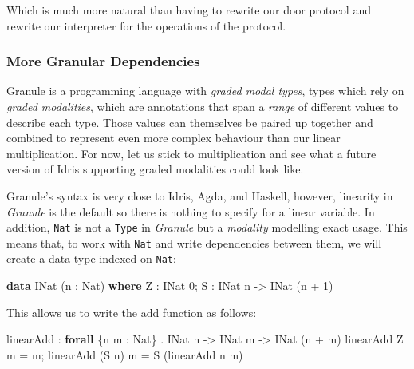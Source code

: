 \documentclass[
]{article}
\newenvironment{Shaded}{}{}
\newcommand{\DataTypeTok}[1]{\textcolor[rgb]{0.56,0.13,0.00}{#1}}
\newcommand{\DecValTok}[1]{\textcolor[rgb]{0.25,0.63,0.44}{#1}}
\newcommand{\KeywordTok}[1]{\textcolor[rgb]{0.00,0.44,0.13}{\textbf{#1}}}
\newcommand{\NormalTok}[1]{#1}
\newcommand{\OperatorTok}[1]{\textcolor[rgb]{0.40,0.40,0.40}{#1}}
\newcommand{\OtherTok}[1]{\textcolor[rgb]{0.00,0.44,0.13}{#1}}
\begin{document}
Which is much more natural than having to rewrite our door protocol and
rewrite our interpreter for the operations of the protocol.

\hypertarget{more-granular-dependencies}{%
\subsubsection{More Granular
Dependencies}\label{more-granular-dependencies}}

Granule is a programming language with \emph{graded modal types}, types
which rely on \emph{graded modalities}, which are annotations that span
a \emph{range} of different values to describe each type. Those values
can themselves be paired up together and combined to represent even more
complex behaviour than our linear multiplication. For now, let us stick
to multiplication and see what a future version of Idris supporting
graded modalities could look like.

Granule's syntax is very close to Idris, Agda, and Haskell, however,
linearity in \emph{Granule} is the default so there is nothing to
specify for a linear variable. In addition, \texttt{Nat} is not a
\texttt{Type} in \emph{Granule} but a \emph{modality} modelling exact
usage. This means that, to work with \texttt{Nat} and write dependencies
between them, we will create a data type indexed on \texttt{Nat}:

\begin{Shaded}
\begin{Highlighting}[]
\KeywordTok{data} \DataTypeTok{INat}\NormalTok{ (n }\OperatorTok{:} \DataTypeTok{Nat}\NormalTok{) }\KeywordTok{where}
  \DataTypeTok{Z} \OperatorTok{:} \DataTypeTok{INat} \DecValTok{0}\NormalTok{;}
  \DataTypeTok{S} \OperatorTok{:} \DataTypeTok{INat}\NormalTok{ n }\OtherTok{{-}\textgreater{}} \DataTypeTok{INat}\NormalTok{ (n }\OperatorTok{+} \DecValTok{1}\NormalTok{)}
\end{Highlighting}
\end{Shaded}

This allows us to write the add function as follows:

\begin{Shaded}
\begin{Highlighting}[]
\NormalTok{linearAdd }\OperatorTok{:} \KeywordTok{forall}\NormalTok{ \{n m }\OperatorTok{:} \DataTypeTok{Nat}\NormalTok{\} }\OperatorTok{.} \DataTypeTok{INat}\NormalTok{ n }\OtherTok{{-}\textgreater{}} \DataTypeTok{INat}\NormalTok{ m }\OtherTok{{-}\textgreater{}} \DataTypeTok{INat}\NormalTok{ (n }\OperatorTok{+}\NormalTok{ m)}
\NormalTok{linearAdd }\DataTypeTok{Z}\NormalTok{ m }\OtherTok{=}\NormalTok{ m;}
\NormalTok{linearAdd (}\DataTypeTok{S}\NormalTok{ n) m }\OtherTok{=} \DataTypeTok{S}\NormalTok{ (linearAdd n m)}
\end{Highlighting}
\end{Shaded}
\end{document}
